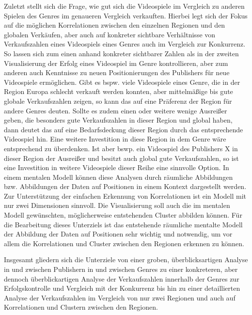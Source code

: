 \documentclass[usegeometry=true]{scrartcl}
\begin{document}
Zuletzt stellt sich die Frage, wie gut sich die Videospiele im Vergleich zu anderen Spielen des Genres im genaueren Vergleich verkauften. 
Hierbei legt sich der Fokus auf die möglichen Korrelationen zwischen den einzelnen Regionen und den globalen Verkäufen, aber auch auf konkreter sichtbare Verhältnisse von Verkaufszahlen eines Videospiels eines Genres auch im Vergleich zur Konkurrenz.
So lassen sich zum einen anhand konkreter sichtbarer Zahlen als in der zweiten Visualisierung der Erfolg eines Videospiel im Genre kontrollieren, aber zum anderen auch Kenntnisse zu neuen Positionierungen des Publishers für neue Videospiele ermöglichen.
Gibt es bspw. viele Videospiele eines Genre, die in der Region Europa schlecht verkauft werden konnten, aber mittelmäßige bis gute globale Verkaufszahlen zeigen, so kann das auf eine Präferenz der Region für andere Genres deuten. 
Sollte es zudem einen oder weitere wenige Ausreißer geben, die besonders gute Verkaufszahlen in dieser Region und global haben, dann deutet das auf eine Bedarfsdeckung dieser Region durch das entsprechende Videospiel hin. 
Eine weitere Investition in diese Region in dem Genre wäre entsprechend zu überdenken. Ist aber bswp. ein Videospiel des Publishers X in dieser Region der Ausreißer und besitzt auch global gute Verkaufszahlen, so ist eine Investition in weitere Videospiele dieser Reihe eine sinnvolle Option.
In einem mentalen Modell können diese Analysen durch räumliche Abbildungen bzw. Abbildungen der Daten auf Positionen in einem Kontext dargestellt werden. 
Zur Unterstützung der einfachen Erkennung von Korrelationen ist ein Modell mit nur zwei Dimensionen sinnvoll. 
Die Visualisierung soll auch die im mentalen Modell gewünschten, möglicherweise entstehenden Cluster abbilden können. 
Für die Bearbeitung dieses Unterziels ist das entstehende räumliche mentalte Modell der Abbildung der Daten auf Positionen sehr wichtig und notwendig, um vor allem die Korrelationen und Cluster zwischen den Regionen erkennen zu können.

Insgesamt gliedern sich die Unterziele von einer groben, überblicksartigen Analyse in und zwischen Publishern in und zwischen Genres 
zu einer konkreteren, aber dennoch überblickartigen Analyse der Verkaufszahlen innerhalb der Genres zur Erfolgskontrolle und Vergleich mit der Konkurrenz 
bis hin zu einer detaillierten Analyse der Verkaufszahlen im Vergleich von nur zwei Regionen und auch auf Korrelationen und Clustern zwischen den Regionen.

\end{document}
